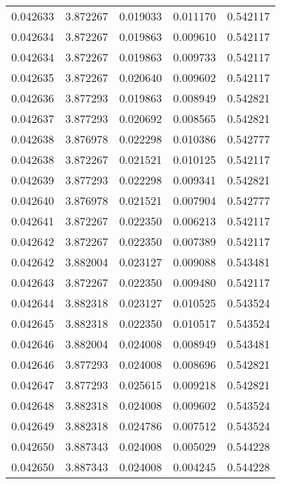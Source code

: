 \begin{tabular}{lrrrr}
0.042633    &  3.872267 &  0.019033 &  0.011170 &             0.542117 \\
0.042634    &  3.872267 &  0.019863 &  0.009610 &             0.542117 \\
0.042634    &  3.872267 &  0.019863 &  0.009733 &             0.542117 \\
0.042635    &  3.872267 &  0.020640 &  0.009602 &             0.542117 \\
0.042636    &  3.877293 &  0.019863 &  0.008949 &             0.542821 \\
0.042637    &  3.877293 &  0.020692 &  0.008565 &             0.542821 \\
0.042638    &  3.876978 &  0.022298 &  0.010386 &             0.542777 \\
0.042638    &  3.872267 &  0.021521 &  0.010125 &             0.542117 \\
0.042639    &  3.877293 &  0.022298 &  0.009341 &             0.542821 \\
0.042640    &  3.876978 &  0.021521 &  0.007904 &             0.542777 \\
0.042641    &  3.872267 &  0.022350 &  0.006213 &             0.542117 \\
0.042642    &  3.872267 &  0.022350 &  0.007389 &             0.542117 \\
0.042642    &  3.882004 &  0.023127 &  0.009088 &             0.543481 \\
0.042643    &  3.872267 &  0.022350 &  0.009480 &             0.542117 \\
0.042644    &  3.882318 &  0.023127 &  0.010525 &             0.543524 \\
0.042645    &  3.882318 &  0.022350 &  0.010517 &             0.543524 \\
0.042646    &  3.882004 &  0.024008 &  0.008949 &             0.543481 \\
0.042646    &  3.877293 &  0.024008 &  0.008696 &             0.542821 \\
0.042647    &  3.877293 &  0.025615 &  0.009218 &             0.542821 \\
0.042648    &  3.882318 &  0.024008 &  0.009602 &             0.543524 \\
0.042649    &  3.882318 &  0.024786 &  0.007512 &             0.543524 \\
0.042650    &  3.887343 &  0.024008 &  0.005029 &             0.544228 \\
0.042650    &  3.887343 &  0.024008 &  0.004245 &             0.544228 \\

\end{tabular}
